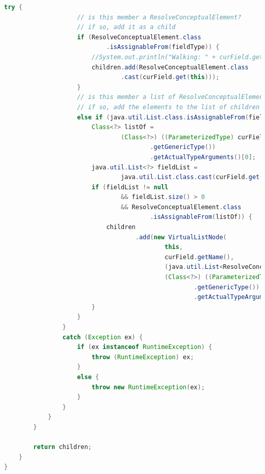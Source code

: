 \documentclass[times]{speauth}
\begin{document}
\begin{lstlisting}[language=java,caption={ResolveConceptualElement.java}]
                try {
                    // is this member a ResolveConceptualElement?
                    // if so, add it as a child
                    if (ResolveConceptualElement.class
                            .isAssignableFrom(fieldType)) {
                        //System.out.println("Walking: " + curField.getName());
                        children.add(ResolveConceptualElement.class
                                .cast(curField.get(this)));
                    }
                    // is this member a list of ResolveConceptualElements?
                    // if so, add the elements to the list of children
                    else if (java.util.List.class.isAssignableFrom(fieldType)) {
                        Class<?> listOf =
                                (Class<?>) ((ParameterizedType) curField
                                        .getGenericType())
                                        .getActualTypeArguments()[0];
                        java.util.List<?> fieldList =
                                java.util.List.class.cast(curField.get(this));
                        if (fieldList != null
                                && fieldList.size() > 0
                                && ResolveConceptualElement.class
                                        .isAssignableFrom(listOf)) {
                            children
                                    .add(new VirtualListNode(
                                            this,
                                            curField.getName(),
                                            (java.util.List<ResolveConceptualElement>) fieldList,
                                            (Class<?>) ((ParameterizedType) curField
                                                    .getGenericType())
                                                    .getActualTypeArguments()[0]));
                        }
                    }
                }
                catch (Exception ex) {
                    if (ex instanceof RuntimeException) {
                        throw (RuntimeException) ex;
                    }
                    else {
                        throw new RuntimeException(ex);
                    }
                }
            }
        }

        return children;
    }
}
\end{lstlisting}
\end{document}
